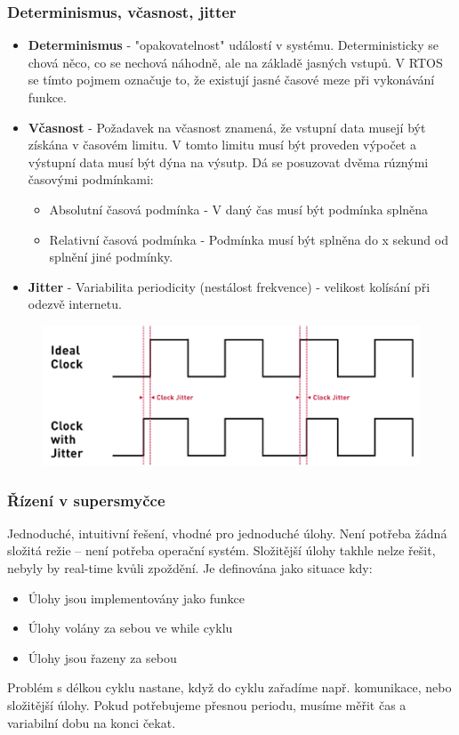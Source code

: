 \subsubsection*{Determinismus, včasnost, jitter}
\begin{itemize}
  \item \textbf{Determinismus} - "opakovatelnost" událostí v systému. Deterministicky se chová něco, co se nechová náhodně, ale na základě jasných vstupů. V RTOS se tímto pojmem označuje to, že existují jasné časové meze při vykonávání funkce.
  \item  \textbf{Včasnost} - Požadavek na včasnost znamená, že vstupní data musejí být získána v časovém limitu. V tomto limitu musí být proveden výpočet a výstupní data musí být dýna na výsutp. Dá se posuzovat dvěma rúznými časovými podmínkami: \begin{itemize}
    \item Absolutní časová podmínka - V daný čas musí být podmínka splněna
    \item Relativní časová podmínka - Podmínka musí být splněna do x sekund od splnění jiné podmínky.
  \end{itemize}
  \item \textbf{Jitter} - Variabilita periodicity (nestálost frekvence) - velikost kolísání při odezvě internetu.
\end{itemize}

\begin{figure}[h]
  \begin{center}
    \includegraphics[scale = 1]{img/Picture24.png}
  \end{center}
\end{figure}

\subsubsection*{Řízení v supersmyčce}
Jednoduché, intuitivní řešení, vhodné pro jednoduché úlohy. Není potřeba žádná složitá režie – není potřeba operační systém. Složitější úlohy takhle nelze řešit, nebyly by real-time kvůli zpoždění.
Je definována jako situace kdy:
\begin{itemize}
  \item Úlohy jsou implementovány jako funkce
  \item Úlohy volány za sebou ve while cyklu
  \item Úlohy jsou řazeny za sebou
\end{itemize}
Problém s délkou cyklu nastane, když do cyklu zařadíme např. komunikace, nebo složitější úlohy. 
Pokud potřebujeme přesnou periodu, musíme měřit čas a variabilní dobu na konci čekat.

